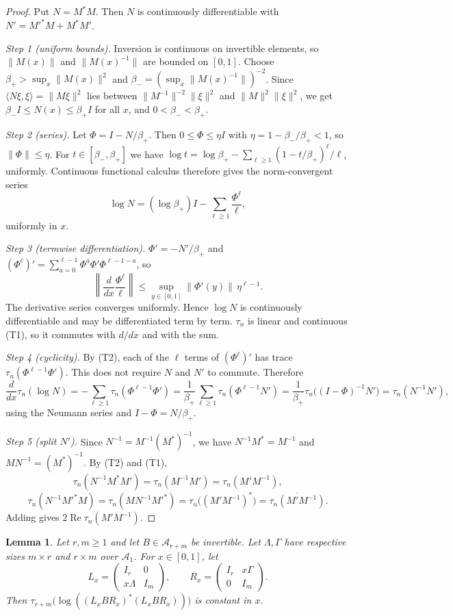 \documentclass[11pt]{article}
\newtheorem{lemma}[theorem]{Lemma}
\theoremstyle{remark}
\numberwithin{equation}{section}
\begin{document}
\begin{proof}
Put $N=M^*M$. Then $N$ is continuously differentiable with $N'=M'^*M+M^*M'$.

\emph{Step 1 (uniform bounds).} Inversion is continuous on invertible elements, so $\|M(x)\|$ and $\|M(x)^{-1}\|$ are bounded on $[0,1]$. Choose $\beta_+>\sup_x\|M(x)\|^2$ and $\beta_-=(\sup_x\|M(x)^{-1}\|)^{-2}$. Since $\langle N\xi,\xi\rangle=\|M\xi\|^2$ lies between $\|M^{-1}\|^{-2}\|\xi\|^2$ and $\|M\|^2\|\xi\|^2$, we get $\beta_-I\le N(x)\le\beta_+I$ for all $x$, and $0<\beta_-<\beta_+$.

\emph{Step 2 (series).} Let $\Phi=I-N/\beta_+$. Then $0\le\Phi\le\eta I$ with $\eta=1-\beta_-/\beta_+<1$, so $\|\Phi\|\le\eta$. For $t\in[\beta_-,\beta_+]$ we have $\log t=\log\beta_+-\sum_{\ell\ge1}(1-t/\beta_+)^\ell/\ell$, uniformly. Continuous functional calculus therefore gives the norm-convergent series
\[
 \log N=(\log \beta_+)I-\sum_{\ell\ge1}\frac{\Phi^\ell}{\ell},
\]
uniformly in $x$.

\emph{Step 3 (termwise differentiation).} $\Phi'=-N'/\beta_+$ and $(\Phi^\ell)'=\sum_{a=0}^{\ell-1}\Phi^a\Phi'\Phi^{\ell-1-a}$, so
\[
 \left\|\frac{d}{dx}\frac{\Phi^\ell}{\ell}\right\|
 \le\sup_{y\in[0,1]}\|\Phi'(y)\|\,\eta^{\ell-1}.
\]
The derivative series converges uniformly. Hence $\log N$ is continuously differentiable and may be differentiated term by term. $\tau_n$ is linear and continuous (T1), so it commutes with $d/dx$ and with the sum.

\emph{Step 4 (cyclicity).} By (T2), each of the $\ell$ terms of $(\Phi^\ell)'$ has trace $\tau_n(\Phi^{\ell-1}\Phi')$. This does not require $N$ and $N'$ to commute. Therefore
\[
 \frac{d}{dx}\tau_n(\log N)
 =-\sum_{\ell\ge1}\tau_n(\Phi^{\ell-1}\Phi')
 =\frac1{\beta_+}\sum_{\ell\ge1}\tau_n(\Phi^{\ell-1}N')
 =\frac1{\beta_+}\tau_n\bigl((I-\Phi)^{-1}N'\bigr)
 =\tau_n(N^{-1}N'),
\]
using the Neumann series and $I-\Phi=N/\beta_+$.

\emph{Step 5 (split $N'$).} Since $N^{-1}=M^{-1}(M^*)^{-1}$, we have $N^{-1}M^*=M^{-1}$ and $MN^{-1}=(M^*)^{-1}$. By (T2) and (T1),
\[
 \tau_n(N^{-1}M^*M')=\tau_n(M^{-1}M')=\tau_n(M'M^{-1}),
\]
\[
 \tau_n(N^{-1}M'^*M)=\tau_n(MN^{-1}M'^*)=\tau_n\bigl((M'M^{-1})^*\bigr)=\overline{\tau_n(M'M^{-1})}.
\]
Adding gives $2\operatorname{Re}\tau_n(M'M^{-1})$.
\end{proof}

\begin{lemma}\label{lem:shears}
Let $r,m\ge1$ and let $B\in\mathcal A_{r+m}$ be invertible.
Let $\Lambda,\Gamma$ have respective sizes $m\times r$ and $r\times m$ over
$\mathcal A_1$. For $x\in[0,1]$, let
\[
 L_x=\begin{pmatrix}I_r&0\\x\Lambda&I_m\end{pmatrix},\qquad
 R_x=\begin{pmatrix}I_r&x\Gamma\\0&I_m\end{pmatrix}.
\]
Then $\tau_{r+m}\bigl(\log((L_xBR_x)^*(L_xBR_x))\bigr)$ is constant in $x$.
\end{lemma}
\end{document}
